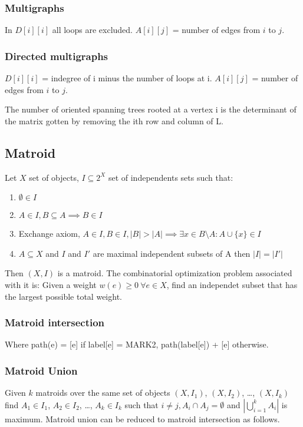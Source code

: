 \documentclass[a4paper,10pt,oneside]{article}
\newcommand\includess[2]{
   \subsubsection{#1}
   
}
\begin{document}
\begin{multicols}{2}
\subsubsection{Multigraphs}
In $D[i][i]$ all loops are excluded. $A[i][j]$ = number of edges from $i$ to $j$.

\subsubsection{Directed multigraphs}
$D[i][i]$ = indegree of i minus the number of loops at i. $A[i][j]$ = number of edges from $i$ to $j$.

The number of oriented spanning trees rooted at a vertex i is the determinant of the matrix gotten by removing the ith row and column of L.

\subsection{Matroid}
Let $X$ set of objects, $I \subseteq 2^X$ set of independents sets such that:
\begin{enumerate}
\item $\emptyset \in I$
\item $A \in I, B \subseteq A \implies B \in I$
\item Exchange axiom, $A \in I, B \in I, |B| > |A| \implies \exists x \in B \setminus A : A \cup \{x\} \in I$
\item $A \subseteq X$ and $I$ and $I'$ are maximal independent subsets of A then $|I| = |I'|$
\end{enumerate}
Then $(X, I)$ is a matroid. The combinatorial optimization problem associated with it is: Given a weight $w(e) \geq 0 ~\forall e \in X$, find an independet subset that has the largest possible total weight.

\includess{Matroid intersection}{code/matroid.cpp}

Where path(e) = [e] if label[e] = MARK2, path(label[e]) + [e] otherwise.

\subsubsection{Matroid Union}
Given $k$ matroids over the same set of objects $(X, I_1)$, $(X, I_2)$, \dots, $(X, I_k)$ find $A_1 \in I_1$, $A_2 \in I_2$, \dots, $A_k \in I_k$ such that $i \not= j, A_i \cap A_j = \emptyset$ and $|\bigcup\limits_{i=1}^{k} A_i|$ is maximum. Matroid union can be reduced to matroid intersection as follows.


\end{multicols}
\end{document}
